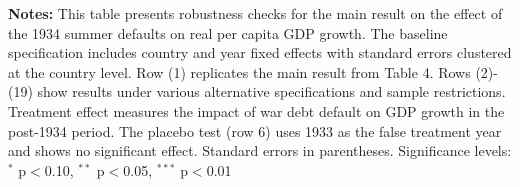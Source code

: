 \begin{table}[htbp]
\vspace{0.3cm}
\begin{minipage}{\textwidth}
\footnotesize
\textbf{Notes:} This table presents robustness checks for the main result on the effect of the 1934 summer defaults on real per capita GDP growth. The baseline specification includes country and year fixed effects with standard errors clustered at the country level. Row (1) replicates the main result from Table 4. Rows (2)-(19) show results under various alternative specifications and sample restrictions. Treatment effect measures the impact of war debt default on GDP growth in the post-1934 period. The placebo test (row 6) uses 1933 as the false treatment year and shows no significant effect. Standard errors in parentheses. Significance levels: $^*$ p$<$0.10, $^{**}$ p$<$0.05, $^{***}$ p$<$0.01
\end{minipage}
\end{table}
